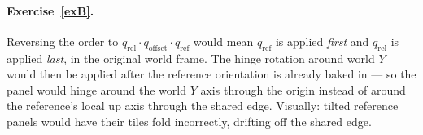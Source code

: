 \documentclass{article}
\begin{document}
\paragraph{Exercise~\ref{exB}.} Reversing the order to
$q_{\text{rel}} \cdot q_{\text{offset}} \cdot q_{\text{ref}}$ would mean
$q_{\text{ref}}$ is applied \emph{first} and $q_{\text{rel}}$ is applied
\emph{last}, in the original world frame. The hinge rotation around
world $Y$ would then be applied after the reference orientation is
already baked in --- so the panel would hinge around the world $Y$ axis
through the origin instead of around the reference's local up axis
through the shared edge. Visually: tilted reference panels would have
their tiles fold incorrectly, drifting off the shared edge.
\end{document}
